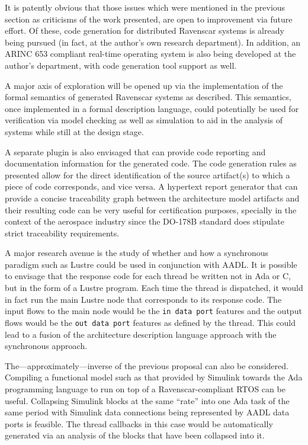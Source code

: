 It is patently obvious that those issues which were mentioned in the
previous section as criticisms of the work presented, are open to
improvement via future effort. Of these, code generation for
distributed Ravenscar systems is already being pursued (in fact, at
the author's own research department). In addition, an ARINC 653
compliant real-time operating system is also being developed at the
author's department, with code generation tool support as well.

A major axis of exploration will be opened up via the implementation
of the formal semantics of generated Ravenscar systems as
described. This semantics, once implemented in a formal description
language, could potentially be used for verification via model
checking as well as simulation to aid in the analysis of systems while
still at the design stage.

A separate plugin is also envisaged that can provide code reporting and
documentation information for the generated code. The code generation
rules as presented allow for the direct identification of the source
artifact(s) to which a piece of code corresponds, and vice versa. A
hypertext report generator that can provide a concise traceability
graph between the architecture model artifacts and their resulting
code can be very useful for certification purposes, specially in the
context of the aerospace industry since the DO-178B standard does
stipulate strict traceability requirements.

A major research avenue is the study of whether and how a synchronous
paradigm such as Lustre could be used in conjunction with AADL. It is
possible to envisage that the response code for each thread be written
not in Ada or C, but in the form of a Lustre program. Each time the
thread is dispatched, it would in fact run the main Lustre node that
corresponds to its response code. The input flows to the main node
would be the \texttt{in data port} features and the output flows would
be the \texttt{out data port} features as defined by the thread. This
could lead to a fusion of the architecture description language
approach with the synchronous approach.

The---approximately---inverse of the previous proposal can also be
considered. Compiling a functional model such as that provided by
Simulink towards the Ada programming language to run on top of a
Ravenscar-compliant RTOS can be useful. Collapsing Simulink blocks at
the same ``rate'' into one Ada task of the same period with Simulink
data connections being represented by AADL data ports is feasible. The
thread callbacks in this case would be automatically generated via an
analysis of the blocks that have been collapsed into it.


